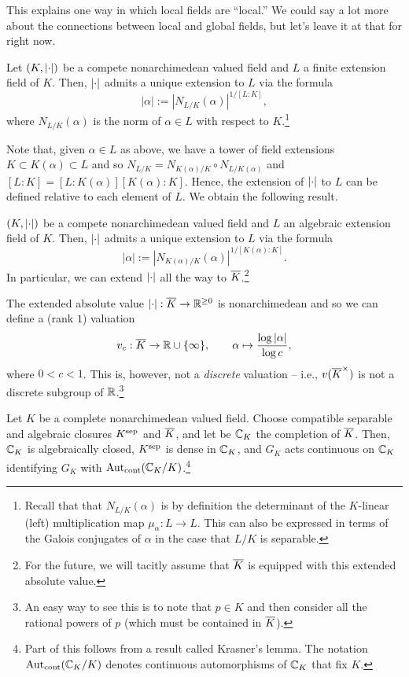 \documentclass[11pt]{article}
\begin{document}
This explains one way in which local fields are ``local.'' We could say a lot more about the connections between local and global fields, but let's leave it at that for right now.

\begin{proposition}
Let $(K,\left\lvert\cdot\right\rvert)$ be a compete nonarchimedean valued field and $L$ a finite extension field of $K$. Then, $\left\lvert\cdot\right\rvert$ admits a unique extension to $L$ via the formula
$$|\alpha|:=|N_{L/K}(\alpha)|^{1/[L:K]},$$
where $N_{L/K}(\alpha)$ is the norm of $\alpha\in L$ with respect to $K$.\footnote{Recall that that $N_{L/K}(\alpha)$ is by definition the determinant of the $K$-linear (left) multiplication map $\mu_{\alpha}: L\to L$. This can also be expressed in terms of the Galois conjugates of $\alpha$ in the case that $L/K$ is separable.}
\end{proposition}

Note that, given $\alpha\in L$ as above, we have a tower of field extensions $K\subset K(\alpha)\subset L$ and so $N_{L/K}=N_{K(\alpha)/K}\circ N_{L/K(\alpha)}$ and $[L:K]=[L:K(\alpha)][K(\alpha):K]$. Hence, the extension of $\left\lvert\cdot\right\rvert$ to $L$ can be defined relative to each element of $L$. We obtain the following result.

\begin{corollary}
$(K,\left\lvert\cdot\right\rvert)$ be a compete nonarchimedean valued field and $L$ an algebraic extension field of $K$. Then, $\left\lvert\cdot\right\rvert$ admits a unique extension to $L$ via the formula
$$|\alpha|:=|N_{K(\alpha)/K}(\alpha)|^{1/[K(\alpha):K]}.$$
In particular, we can extend $\left\lvert\cdot\right\rvert$ all the way to $\overline{K}$.\footnote{For the future, we will tacitly assume that $\overline{K}$ is equipped with this extended absolute value.}
\end{corollary}

\begin{remark}
The extended absolute value $\left\lvert\cdot\right\rvert: \overline{K}\to\mathbb{R}^{\geq0}$ is nonarchimedean and so we can define a (rank $1$) valuation 
$$v_c: \overline{K}\to\mathbb{R}\cup\{\infty\},\qquad \alpha\mapsto\dfrac{\log|\alpha|}{\log c},$$
where $0<c<1$. This is, however, not a \emph{discrete} valuation -- i.e., $v(\overline{K}^{\times})$ is not a discrete subgroup of $\mathbb{R}$.\footnote{An easy way to see this is to note that $p\in K$ and then consider all the rational powers of $p$ (which must be contained in $\overline{K}$).}
\end{remark}

\begin{theorem}
Let $K$ be a complete nonarchimedean valued field. Choose compatible separable and algebraic closures $K^{\operatorname{sep}}$ and $\overline{K}$, and let be $\mathbb{C}_K$ the completion of $\overline{K}$. Then, $\mathbb{C}_K$ is algebraically closed, $K^{\operatorname{sep}}$ is dense in $\mathbb{C}_K$, and $G_K$ acts continuous on $\mathbb{C}_K$ identifying $G_K$ with $\operatorname{Aut}_{\operatorname{cont}}(\mathbb{C}_K/K)$.\footnote{Part of this follows from a result called Krasner's lemma. The notation $\operatorname{Aut}_{\operatorname{cont}}(\mathbb{C}_K/K)$ denotes continuous automorphisms of $\mathbb{C}_K$ that fix $K$.}
\end{theorem}
\end{document}
